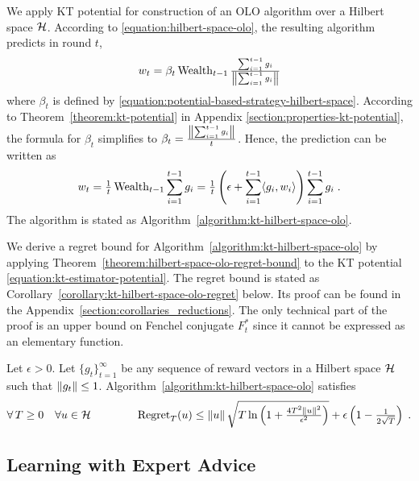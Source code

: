 We apply KT potential for construction of an OLO algorithm over a Hilbert
space $\mathcal{H}$. According to \eqref{equation:hilbert-space-olo}, the resulting algorithm predicts
in round $t$,
\[
w_t = \beta_t \operatorname{Wealth}_{t-1} \tfrac{\sum_{i=1}^{t-1} g_i}{\left\|{\sum_{i=1}^{t-1} g_i}\right\|}
\]
where $\beta_t$ is defined by
\eqref{equation:potential-based-strategy-hilbert-space}. According to
Theorem~\ref{theorem:kt-potential} in Appendix
\ref{section:properties-kt-potential}, the formula for $\beta_t$ simplifies to
$\beta_t = \frac{\left\|{\sum_{i=1}^{t-1} g_i}\right\|}{t}$. Hence, the prediction can be
written as
\[
w_t
= \tfrac{1}{t} \operatorname{Wealth}_{t-1} \sum_{i=1}^{t-1} g_i
= \tfrac{1}{t} \left(\epsilon + \sum_{i=1}^{t-1} \langle g_i, w_i \rangle \right) \sum_{i=1}^{t-1} g_i \; .
\]
The algorithm is stated as Algorithm~\ref{algorithm:kt-hilbert-space-olo}.

We derive a regret bound for Algorithm~\ref{algorithm:kt-hilbert-space-olo} by
applying Theorem~\ref{theorem:hilbert-space-olo-regret-bound} to the KT
potential \eqref{equation:kt-estimator-potential}. The regret bound is stated as
Corollary~\ref{corollary:kt-hilbert-space-olo-regret} below. Its proof can be
found in the Appendix~\ref{section:corollaries_reductions}. The only technical
part of the proof is an upper bound on Fenchel conjugate $F_t^*$ since it cannot
be expressed as an elementary function.

\begin{corollary}
\label{corollary:kt-hilbert-space-olo-regret}
Let $\epsilon > 0$. Let $\{g_t\}_{t=1}^\infty$ be any sequence of reward vectors
in a Hilbert space $\mathcal{H}$ such that $\left\|{g_t}\right\| \le 1$.
Algorithm~\ref{algorithm:kt-hilbert-space-olo} satisfies
\[
\forall \, T \ge 0 \quad
\forall u \in \mathcal{H} \qquad \qquad
\operatorname{Regret}_T(u) \le \left\|{u}\right\| \sqrt{T \ln\left(1 + \tfrac{4T^2 \left\|{u}\right\|^2}{\epsilon^2} \right)} + \epsilon \left(1 - \tfrac{1}{2\sqrt{T}} \right) \;.
\]
\end{corollary}

\subsection{Learning with Expert Advice}
\label{sec:kt-lea}

